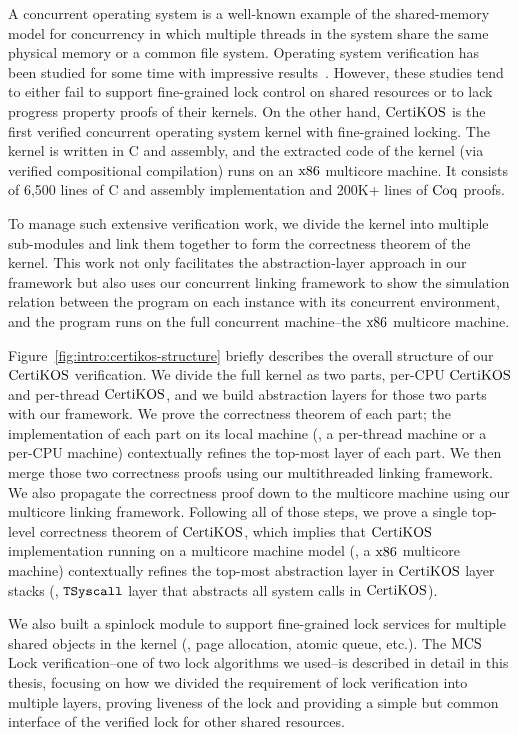 A concurrent operating system is a well-known example of the shared-memory model for concurrency in which multiple threads in the system share the same physical memory or a common file system.
Operating system verification has been studied for some time with impressive results~\cite{klein2009sel4, xu16, hawblitzel10}.
However, these studies tend to either fail to support fine-grained lock control on shared resources or to lack progress property proofs of their kernels. 
On the other hand, $\mathrm{CertiKOS}$ is the first verified concurrent operating system kernel with fine-grained locking. 
The kernel is written in C and assembly, and the extracted code of the kernel (via verified compositional compilation) runs on an $\mathrm{x86}$ multicore machine. 
It consists of 6,500 lines of C and assembly implementation and 200K+ lines of $\mathrm{Coq}$ proofs. 

To manage such extensive verification work, we divide the kernel into multiple sub-modules and link them together to form the correctness theorem of the kernel. 
This work not only facilitates the abstraction-layer approach in our framework but also uses our concurrent linking framework to show the simulation relation between the program on each instance with its concurrent environment, and the program runs on the full concurrent machine--the $\mathrm{x86}$ multicore machine. 

Figure~\ref{fig:intro:certikos-structure} briefly describes the overall structure of our $\mathrm{CertiKOS}$ verification. 
We divide the full kernel as two parts, per-CPU $\mathrm{CertiKOS}$ and per-thread $\mathrm{CertiKOS}$, 
and we build abstraction layers for those two parts with our framework. 
We prove the correctness theorem of each part; the implementation of each part on its local machine (\ie, a per-thread machine or a per-CPU machine) contextually refines the top-most layer of each part. 
We then merge those two correctness proofs using our multithreaded linking framework. 
We also propagate the correctness proof down to the multicore machine using our multicore linking framework. 
Following all of those steps, we prove a single top-level correctness theorem of $\mathrm{CertiKOS}$, which implies that $\mathrm{CertiKOS}$ implementation running on a multicore machine model (\ie, a $\mathrm{x86}$ multicore machine) contextually refines the top-most abstraction layer in $\mathrm{CertiKOS}$ layer stacks (\ie, ${{\mathrm{\texttt{TSyscall}}}}$ layer that abstracts all system calls in $\mathrm{CertiKOS}$). 




We also built a spinlock module to support fine-grained lock services for multiple shared objects in the kernel (\ie, page allocation, atomic queue, etc.).
The $\mathrm{MCS}$ Lock verification--one of two lock algorithms we used--is described in detail in this thesis, focusing on how we divided the requirement of lock verification into multiple layers, proving liveness of the lock and providing a simple but common interface of the verified lock for other shared resources. 

